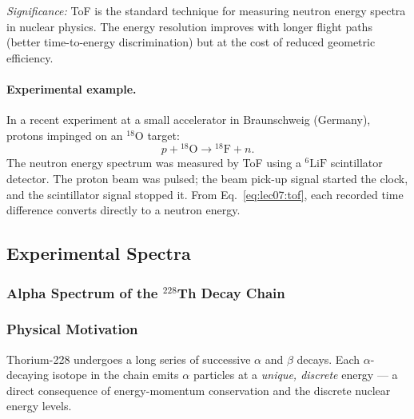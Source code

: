 
\textit{Significance:} ToF is the standard technique for measuring neutron
energy spectra in nuclear physics.  The energy resolution improves with longer
flight paths (better time-to-energy discrimination) but at the cost of reduced
geometric efficiency.

\paragraph{Experimental example.}
In a recent experiment at a small accelerator in Braunschweig (Germany), protons
impinged on an ${}^{18}\text{O}$ target:
\begin{equation}
  p + {}^{18}\text{O} \to {}^{18}\text{F} + n.
\end{equation}
The neutron energy spectrum was measured by ToF using a $^6\text{LiF}$ scintillator
detector.  The proton beam was pulsed; the beam pick-up signal started the clock,
and the scintillator signal stopped it.  From Eq.~\eqref{eq:lec07:tof}, each
recorded time difference converts directly to a neutron energy.

\subsection{Experimental Spectra}
\label{subsec:lec07:spectra}

\subsubsection*{Alpha Spectrum of the $^{228}$Th Decay Chain}

\subsubsection*{Physical Motivation}
Thorium-228 undergoes a long series of successive $\alpha$ and $\beta$ decays.
Each $\alpha$-decaying isotope in the chain emits $\alpha$ particles at a
\emph{unique, discrete} energy — a direct consequence of energy-momentum
conservation and the discrete nuclear energy levels.

